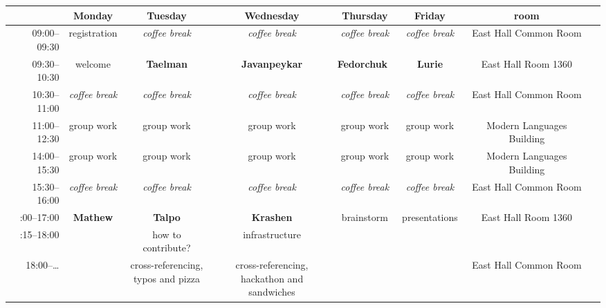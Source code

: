 \documentclass[letterpaper,10pt]{article}
\begin{document}

\begin{landscape}
  \newcommand\coffeebreak{\emph{coffee break}}
  \newcommand\groupwork{group work}
  \newcommand\lunch{\emph{lunch}}
  \renewcommand{\arraystretch}{1.35}
  \begin{table}
    \centering
    \begin{tabular}{rccccccc}
      \toprule
                    & Monday              & Tuesday             & Wednesday            & Thursday           & Friday          & room \\
      \midrule
      09:00--09:30  & registration        & \coffeebreak        & \coffeebreak         & \coffeebreak       & \coffeebreak    & East Hall Common Room\\
      09:30--10:30  & welcome             & \textbf{Taelman}    & \textbf{Javanpeykar} & \textbf{Fedorchuk} & \textbf{Lurie}  & East Hall Room 1360 \\
      10:30--11:00  & \coffeebreak        & \coffeebreak        & \coffeebreak         & \coffeebreak       & \coffeebreak    & East Hall Common Room \\
      11:00--12:30  & \groupwork          & \groupwork          & \groupwork           & \groupwork         & \groupwork      & Modern Languages Building \\
      14:00--15:30  & \groupwork          & \groupwork          & \groupwork           & \groupwork         & \groupwork      & Modern Languages Building \\
      15:30--16:00  & \coffeebreak        & \coffeebreak        & \coffeebreak         & \coffeebreak       & \coffeebreak    & East Hall Common Room \\\medskip
      16:00--17:00  & \textbf{Mathew}     & \textbf{Talpo}      & \textbf{Krashen}     & brainstorm         & presentations   & East Hall Room 1360 \\\smallskip
      17:15--18:00  &                     & how to contribute?  & infrastructure \\
      18:00--\ldots &                     & \parbox{3cm}{\centering cross-referencing, \\ typos and pizza} & \parbox{3cm}{\centering cross-referencing, \\ hackathon and sandwiches} & & & East Hall Common Room \\
      \bottomrule
    \end{tabular}
  \end{table}
\end{landscape}
\end{document}

